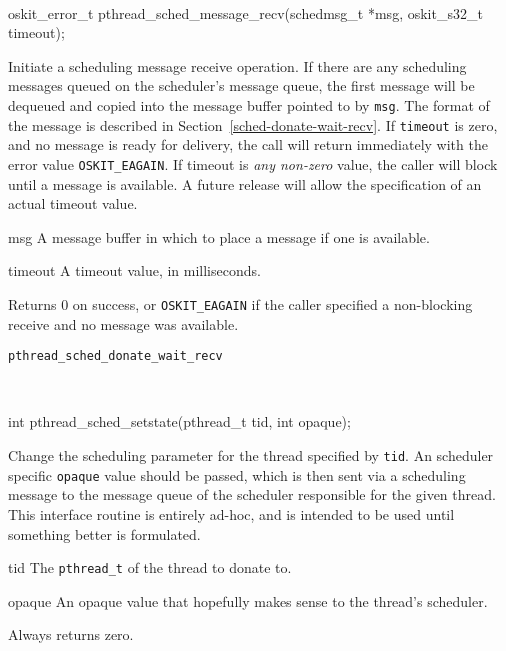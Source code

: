 \begin{apisyn}
	\\

	\funcproto oskit_error_t pthread_sched_message_recv(schedmsg_t *msg,
			oskit_s32_t timeout);
\end{apisyn}
\begin{apidesc}
	Initiate a scheduling message receive operation. If there are any
	scheduling messages queued on the scheduler's message queue, the
	first message will be dequeued and copied into the message buffer
	pointed to by \texttt{msg}. The format of the message is described
	in Section~\ref{sched-donate-wait-recv}. If \texttt{timeout} is
	zero, and no message is ready for delivery, the call will return
	immediately with the error value \texttt{OSKIT_EAGAIN}. If timeout
	is \emph{any non-zero} value, the caller will block until a message
	is available. A future release will allow the specification of an
	actual timeout value.
\end{apidesc}
\begin{apiparm}
	\item[msg]
		A message buffer in which to place a message if one is
		available.
	\item[timeout]
		A timeout value, in milliseconds. 
\end{apiparm}
\begin{apiret}
	Returns 0 on success, or \texttt{OSKIT_EAGAIN} if the caller
	specified a non-blocking receive and no message was available.
\end{apiret}
\begin{apirel}
	{\tt pthread_sched_donate_wait_recv}
\end{apirel}


\begin{apisyn}
	\\

	\funcproto int	pthread_sched_setstate(pthread_t tid, int opaque);
\end{apisyn}
\begin{apidesc}
	Change the scheduling parameter for the thread specified by
	\texttt{tid}. An scheduler specific \texttt{opaque} value should be
	passed, which is then sent via a scheduling message to the message
	queue of the scheduler responsible for the given thread. This
	interface routine is entirely ad-hoc, and is intended to be used
	until something better is formulated.
\end{apidesc}
\begin{apiparm}
	\item[tid]
		The {\tt pthread_t} of the thread to donate to.
	\item[opaque]
		An opaque value that hopefully makes sense to the thread's
		scheduler. 
\end{apiparm}
\begin{apiret}
	Always returns zero.
\end{apiret}



